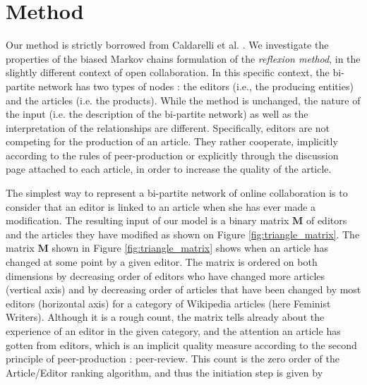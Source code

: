 \section{Method}
Our method is strictly borrowed from Caldarelli et al. \cite{caldarelli2012network}. We investigate the properties of the biased Markov chains formulation of the {\it reflexion method}, in the slightly different context of open collaboration. In this specific context, the bi-partite network has two types of nodes : the editors (i.e., the producing entities) and the articles (i.e. the products). While the method is unchanged, the nature of the input (i.e. the description of the bi-partite network) as well as the interpretation of the relationships are different. Specifically, editors are not competing for the production of an article. They rather cooperate, implicitly according to the rules of peer-production or explicitly through the discussion page attached to each article, in order to increase the quality of the article.

The simplest way to represent a bi-partite network of online collaboration is to consider that an editor is linked to an article when she has ever made a modification. The resulting input of our model is a binary matrix $\mathbf{M}$ of editors and the articles they have modified as shown on Figure \ref{fig:triangle_matrix}. The matrix $\mathbf{M}$ shown in Figure \ref{fig:triangle_matrix} shows when an article has changed at some point by a given editor. The matrix is ordered on both dimensions by decreasing order of editors who have changed more articles (vertical axis) and by decreasing order of articles that have been changed by most editors (horizontal axis) for a category of Wikipedia articles (here Feminist Writers). Although it is a rough count, the matrix tells already about the experience of an editor in the given category, and the attention an article has gotten from editors, which is an implicit quality measure according to the second principle of peer-production : peer-review. This count is the zero order of the Article/Editor ranking algorithm, and thus the initiation step is given by

